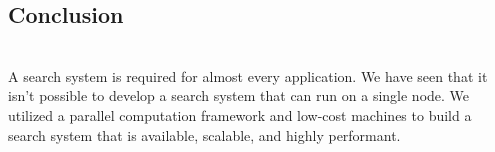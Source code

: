 \subsection{Conclusion}\label{sYkJZPI4j5U3ZyQr-xKCe}
\\
A search system is required for almost every application. We have seen that it isn't possible to develop a search system that can run on a single node. We utilized a parallel computation framework and low-cost machines to build a search system that is available, scalable, and highly performant.

